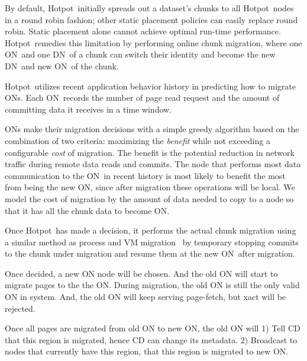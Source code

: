 \documentclass[sigconf]{acmart}
\renewcommand{\em}{\it}
\newcommand{\hotpot}{Hotpot}
\newcommand{\cd}{CD}
\newcommand{\on}{ON}
\newcommand{\dn}{DN}
\begin{document}
{By default, \hotpot\ initially spreads out a dataset's chunks to all \hotpot\ nodes in a round robin fashion;
other static placement policies can easily replace round robin.
Static placement alone cannot achieve optimal run-time performance.
\hotpot\ remedies this limitation by performing online chunk migration,
where one \on\ and one \dn\ of a chunk can switch their identity 
and become the new \dn\ and new \on\ of the chunk.

\hotpot\ utilizes recent application behavior history 
in predicting how to migrate \on{}s.
Each \on\ records the number of page read request
and the amount of committing data it receives in a time window.

\on{}s make their migration decisions with a simple greedy algorithm based on the combination of two criteria:
maximizing the {\em benefit} while not exceeding a configurable {\em cost} of migration.
The benefit is the potential reduction in network traffic during remote data reads and commits.
The node that performs most data communication to the \on\ in recent history
is most likely to benefit the most from being the new \on,
since after migration these operations will be local.
We model the cost of migration by the amount of data needed to copy to a node so that it has all the chunk data to become \on.

Once \hotpot\ has made a decision, it performs the actual chunk migration using 
a similar method as process and VM migration~\cite{OsmanEtAl02-Zap,Douglis87-Migration,Clark05-XenMigrate}
by temporary stopping commits to the chunk under migration
and resume them at the new \on\ after migration.

    Once decided, a new ON node will be chosen. And the old ON will start to migrate pages to the
    the ON. During migration, the old ON is still the only valid ON in system. And, the old ON
    will keep serving page-fetch, but xact will be rejected.

    Once all pages are migrated from old ON to new ON, the old ON will 1) Tell CD that this region
    is migrated, hence CD can change its metadata. 2) Broadcast to nodes that currently have this
    region, that this region is migrated to new ON.
\fi

}
\end{document}
